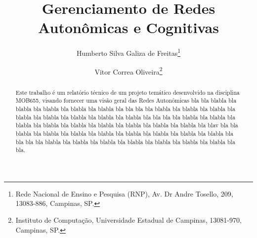 \documentclass[11pt,twoside]{article}
\begin{document}
% 

%



\TRMakeCover


%
\pagestyle{myheadings}

%
\title{Gerenciamento de Redes Autonômicas e Cognitivas}

\author{Humberto Silva Galiza de Freitas\thanks{Rede Nacional de Ensino e Pesquisa (RNP), 
Av. Dr Andre Tosello, 209, 13083-886, Campinas, SP.} \and
Vitor Correa Oliveira\thanks{Instituto  de Computação, Universidade
Estadual  de Campinas, 13081-970, Campinas, SP. }}

\date{}

\maketitle


\begin{abstract} 
  Este trabalho é um relatório técnico de um projeto temático 
  desenvolvido na disciplina MOB655, visando fornecer uma visão geral
  das Redes Autonômicas bla bla blabla bla blabla bla blabla bla blabla bla blabla bla bla
  bla bla blabla bla blabla bla blabla bla blabla bla blabla bla blabla bla blabla bla blabla bla bla
  bla bla blabla bla blabla bla blabla bla blabla bla blabla bla blabla bla blabla bla blabla bla blabla bla blav
  bla bla blabla bla blabla bla blabla bla blabla bla blabla bla blabla bla blabla bla blabla bla bla
  bla bla blabla bla blabla bla blabla bla blabla bla blabla bla blabla bla blabla bla bla.
\end{abstract}
\end{document}
